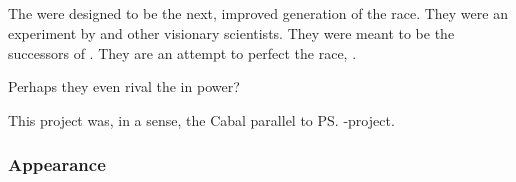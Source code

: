 \subsection{\NeoResphain}
\index{\neoresphan}
The \neoresphain were designed to be the next, improved generation of the \resphan race. 
They were an experiment by  and other visionary scientists. 
They were meant to be the successors of \resphain. 
They are an attempt to perfect the \resphan{} race, . 

Perhaps they even rival the \satharioth{} in power? 

This project was, in a sense, the Cabal parallel to \ps{\Secherdamon} \Vizsherioch-project. 





\subsubsection{Appearance}


